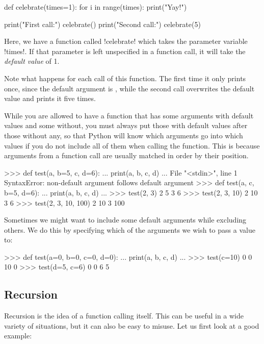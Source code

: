 \documentclass[11pt]{cselabheader}
\begin{document}
\begin{python3code}
def celebrate(times=1):
    for i in range(times):
        print("Yay!")

print("First call:")
celebrate()
print("Second call:")
celebrate(5)
\end{python3code}

Here, we have a function called \pythoninline!celebrate! which takes the parameter
variable \pythoninline!times!. If that parameter is left unspecified in a function
call, it will take the \emph{default value} of 1.

Note what happens for each call of this function. The first time it only prints
 once, since the default argument is , while the
second call overwrites the default value and prints it five times.

While you are allowed to have a function that has some arguments with default
values and some without, you must always put those with default values after
those without any, so that Python will know which arguments go into which values
if you do not include all of them when calling the function. This is because
arguments from a function call are usually matched in order by their position.

\begin{pyconcode}
>>> def test(a, b=5, c, d=6):
...   print(a, b, c, d)
... 
  File "<stdin>", line 1
SyntaxError: non-default argument follows default argument
>>> def test(a, c, b=5, d=6):
...   print(a, b, c, d)
... 
>>> test(2, 3)
2 5 3 6
>>> test(2, 3, 10)
2 10 3 6
>>> test(2, 3, 10, 100)
2 10 3 100
\end{pyconcode}

Sometimes we might want to include some default arguments while excluding
others. We do this by specifying which of the arguments we wish to pass a value
to:

\begin{pyconcode}
>>> def test(a=0, b=0, c=0, d=0):
...   print(a, b, c, d)
... 
>>> test(c=10)
0 0 10 0
>>> test(d=5, c=6)
0 0 6 5
\end{pyconcode}

\subsection{Recursion}
\label{subsec:recur}
Recursion is the idea of a function calling itself. This can be useful in a wide
variety of situations, but it can also be easy to misuse. Let us first look at a
good example:
\end{document}

